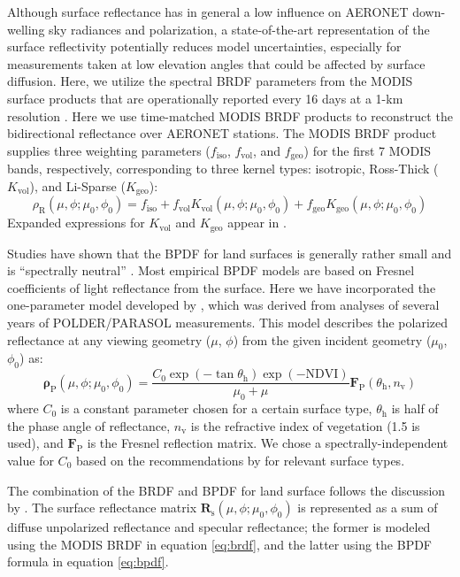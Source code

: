 Although surface reflectance has in general a low influence on AERONET
down-welling sky radiances and polarization, a state-of-the-art
representation of the surface reflectivity potentially reduces model
uncertainties, especially for measurements taken at low elevation angles
that could be affected by surface diffusion. Here, we utilize the
spectral BRDF parameters from the MODIS surface products that are
operationally reported every 16 days at a 1-km resolution
\citep{Lucht00}. Here we use time-matched MODIS BRDF products 
to reconstruct the bidirectional reflectance over AERONET stations.
The MODIS BRDF product supplies three weighting parameters
($f_\text{iso}$, $f_\text{vol}$, and $f_\text{geo}$) for the first 
7 MODIS bands, respectively, corresponding to three kernel types:
isotropic, Ross-Thick ($K_\text{vol}$), and Li-Sparse ($K_\text{geo}$):
\begin{equation}
\rho_\text{R}(\mu,\phi;\mu_0,\phi_0) = f_\text{iso} + 
f_\text{vol}K_\text{vol}(\mu,\phi;\mu_0,\phi_0) +
f_\text{geo}K_\text{geo}(\mu,\phi;\mu_0,\phi_0)  \label{eq:brdf}
\end{equation}
Expanded expressions for $K_\text{vol}$ and $K_\text{geo}$ appear in
\citet{Wanner95, Lucht00}. 

Studies have shown that the BPDF for land surfaces is generally rather
small and is “spectrally neutral” \citep{Nadal99, Maignan04, Maignan09,
Waquet07, Litvinov11}. 
Most empirical BPDF models are based on Fresnel coefficients of light
reflectance from the surface. Here we have incorporated the
one-parameter model developed by \citet{Maignan09}, which was
derived from analyses of several years of POLDER/PARASOL measurements.
This model describes the polarized reflectance at any viewing geometry
($\mu$, $\phi$) from the given incident geometry ($\mu_0$, $\phi_0$) as:
\begin{equation}
\pmb{\rho}_\text{P}(\mu,\phi;\mu_0,\phi_0) = 
\frac{C_0 \exp(-\tan \theta_\text{h})\exp(-\text{NDVI})}{\mu_0+\mu} 
\mathbf{F}_\text{P}(\theta_\text{h},n_\text{v}) \label{eq:bpdf}
\end{equation}
where $C_0$ is a constant parameter chosen for a certain surface type,
$\theta_\text{h}$ is half of the phase angle of reflectance, $n_\text{v}$ is 
the refractive index of vegetation (1.5 is used), and
$\mathbf{F}_\text{P}$ is the Fresnel reflection matrix. 
We chose a spectrally-independent value for $C_0$ based
on the recommendations by \citet{Maignan09} for relevant surface types. 

The combination of the BRDF and BPDF for land surface follows the
discussion by \citet{Dubovik11}. The surface reflectance matrix 
$\mathbf{R}_\text{s}(\mu,\phi;\mu_0,\phi_0)$
is represented as a sum of diffuse unpolarized
reflectance and specular reflectance; the former is modeled using the
MODIS BRDF in equation \eqref{eq:brdf}, and the latter using the BPDF 
formula in equation \eqref{eq:bpdf}. 

